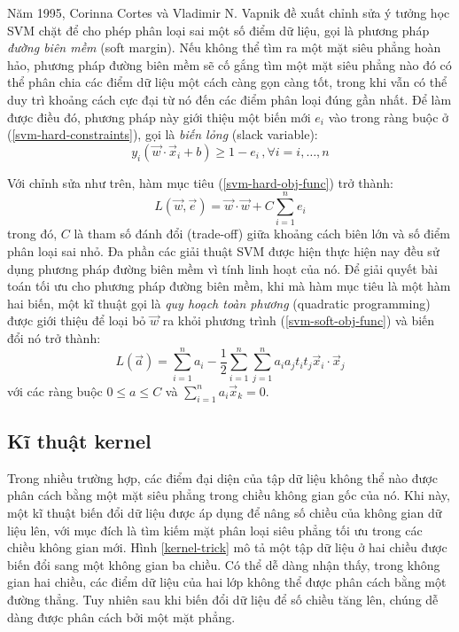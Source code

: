 Năm 1995, Corinna Cortes và Vladimir N. Vapnik đề xuất chỉnh sửa ý tưởng học SVM chặt để cho phép phân loại sai một số điểm dữ liệu, gọi là phương pháp \emph{đường biên mềm} (soft margin). Nếu không thể tìm ra một mặt siêu phẳng hoàn hảo, phương pháp đường biên mềm sẽ cố gắng tìm một mặt siêu phẳng nào đó có thể phân chia các điểm dữ liệu một cách càng gọn càng tốt, trong khi vẫn có thể duy trì khoảng cách cực đại từ nó đến các điểm phân loại đúng gần nhất. Để làm được điều đó, phương pháp này giới thiệu một biến mới $e_i$ vào trong ràng buộc ở (\ref{svm-hard-constraints}), gọi là \emph{biến lỏng} (slack variable):
\begin{equation}
y_i(\vec{w}\cdot\vec{x}_i+b)\geq1-e_i\,,\forall i=i,\dots,n
\end{equation}

Với chỉnh sửa như trên, hàm mục tiêu (\ref{svm-hard-obj-func}) trở thành:
\begin{equation}\label{svm-soft-obj-func}
L(\vec{w},\vec{e})=\vec{w}\cdot\vec{w}+C\sum_{i=1}^{n}e_i
\end{equation}
trong đó, $C$ là tham số đánh đổi (trade-off) giữa khoảng cách biên lớn và số điểm phân loại sai nhỏ. Đa phần các giải thuật SVM được hiện thực hiện nay đều sử dụng phương pháp đường biên mềm vì tính linh hoạt của nó. Để giải quyết bài toán tối ưu cho phương pháp đường biên mềm, khi mà hàm mục tiêu là một hàm hai biến, một kĩ thuật gọi là \emph{quy hoạch toàn phương} (quadratic programming) được giới thiệu để loại bỏ $\vec{w}$ ra khỏi phương trình (\ref{svm-soft-obj-func}) và biến đổi nó trở thành:
\begin{equation}\label{svm-soft-obj-func-modified}
L(\vec{a})=\sum_{i=1}^{n}a_i-\frac{1}{2}\sum_{i=1}^{n}\sum_{j=1}^{n}a_ia_jt_it_j\vec{x}_i\cdot\vec{x}_j
\end{equation}
với các ràng buộc $0\leq a\leq C$ và $\sum_{i=1}^{n}a_i\vec{x}_k=0$.

\subsection*{Kĩ thuật kernel}
Trong nhiều trường hợp, các điểm đại diện của tập dữ liệu không thể nào được phân cách bằng một mặt siêu phẳng trong chiều không gian gốc của nó. Khi này, một kĩ thuật biến đổi dữ liệu được áp dụng để nâng số chiều của không gian dữ liệu lên, với mục đích là tìm kiếm mặt phân loại siêu phẳng tối ưu trong các chiều không gian mới. Hình \ref{kernel-trick} mô tả một tập dữ liệu ở hai chiều được biến đổi sang một không gian ba chiều. Có thể dễ dàng nhận thấy, trong không gian hai chiều, các điểm dữ liệu của hai lớp không thể được phân cách bằng một đường thẳng. Tuy nhiên sau khi biến đổi dữ liệu để số chiều tăng lên, chúng dễ dàng được phân cách bởi một mặt phẳng.

